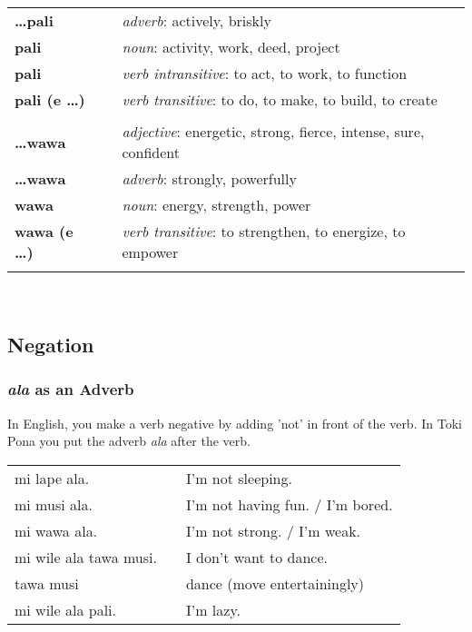 \begin{supertabular}{p{2,5cm}|ll}
\textbf{\dots pali} && \textit{adverb}: actively, briskly \\ %
\textbf{pali} && \textit{noun}: activity, work, deed, project \\ %
\textbf{pali} && \textit{verb intransitive}: to act, to work, to function \\ %
\textbf{pali (e \dots)} && \textit{verb transitive}: to do, to make, to build, to create \\ %
 && \\ %
\textbf{\dots wawa} && \textit{adjective}: energetic, strong, fierce, intense, sure, confident \\ %
\textbf{\dots wawa} && \textit{adverb}: strongly, powerfully \\ %
\textbf{wawa} && \textit{noun}: energy, strength, power \\ %
\textbf{wawa (e \dots)} && \textit{verb transitive}: to strengthen, to energize, to empower \\ %
 && \\ %
\end{supertabular} \\
%
\newpage
{}
\subsection*{Negation}
%

%
\subsubsection*{\textit{ala} as an Adverb}
%

In English, you make a verb negative by adding 'not' in front of the verb.
In Toki Pona you put the adverb \textit{ala} after the verb. 

\begin{supertabular}{p{5,5cm}|ll}
mi lape ala. && I'm not sleeping. \\ 
mi musi ala. && I'm not having fun. / I'm bored. \\
mi wawa ala. && I'm not strong. / I'm weak. \\
mi wile ala tawa musi. && I don't want to dance. \\
tawa musi && dance (move entertainingly) \\
mi wile ala pali. && I'm lazy. \\
\end{supertabular} 

